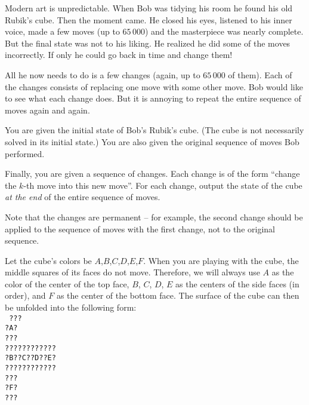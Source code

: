 

Modern art is unpredictable.
When Bob was tidying his room he found his old Rubik's cube.
Then the moment came.
He closed his eyes, listened to his inner voice,
made a few moves (up to $65\,000$) and the masterpiece was nearly complete.
But the final state was not to his liking. He realized he
did some of the moves incorrectly. If only he could go back in time
and change them!

All he now needs to do is a few changes (again, up to $65\,000$ of them).
Each of the changes consists of replacing one move with some other move.
Bob would like to see what each change does.
But it is annoying to repeat the entire sequence
of moves again and again.


You are given the initial state of Bob's Rubik's cube.
(The cube is not necessarily solved in its initial state.)
You are also given the original sequence of moves Bob performed.

Finally, you are given a sequence of changes.
Each change is of the form ``change the $k$-th move into this new move''.
For each change, output the state of the cube \emph{at the end} of the
entire sequence of moves.

Note that the changes are permanent -- for example, the second change
should be applied to the sequence of moves with the first change,
not to the original sequence.


Let the cube's colors be $A$,$B$,$C$,$D$,$E$,$F$.
When you are playing with the cube,
the middle squares of its faces do not move.
Therefore, we will always use $A$
as the color of the center of the top face,
$B$, $C$, $D$, $E$ as the centers of the side faces (in order),
and $F$ as the center of the bottom face.
The surface of the cube can then be unfolded into the following form:\\
\texttt{
???\\
?A?\\
???\\
????????????\\
?B??C??D??E?\\
????????????\\
???\\
?F?\\
???\\
}

